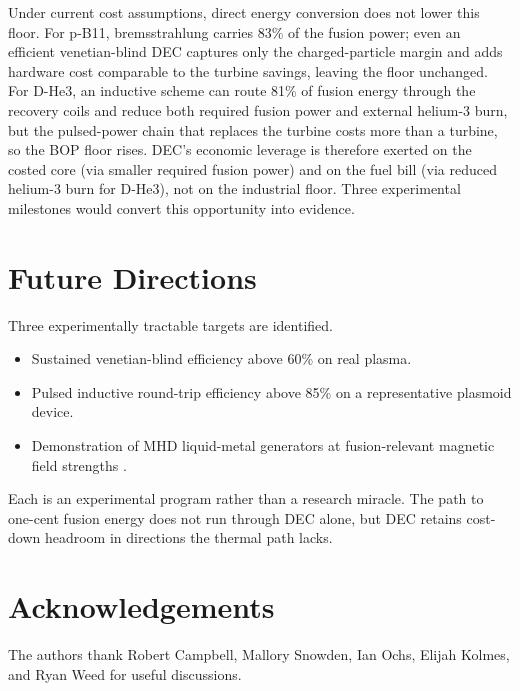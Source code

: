 \documentclass{article}
\begin{document}
Under current cost assumptions, direct energy conversion does not
lower this floor. For p-B11,
bremsstrahlung carries 83\% of the fusion power; even an efficient
venetian-blind DEC captures only the charged-particle margin and
adds hardware cost comparable to the turbine savings, leaving the
floor unchanged. For D-He3, an inductive scheme can route 81\% of
fusion energy through the recovery coils and reduce both required
fusion power and external helium-3 burn, but the pulsed-power chain
that replaces the turbine costs more than a turbine, so the BOP
floor rises. DEC's economic leverage is therefore exerted on the
costed core (via smaller required fusion power) and on the fuel
bill (via reduced helium-3 burn for D-He3), not on the industrial
floor. Three experimental milestones would convert this opportunity
into evidence.

\section{Future Directions}
\label{sec:future}

Three experimentally tractable targets are identified.
\begin{itemize}
\item Sustained venetian-blind efficiency above 60\% on real plasma.
\item Pulsed inductive round-trip efficiency above 85\% on a
representative plasmoid device.
\item Demonstration of MHD liquid-metal generators at
fusion-relevant magnetic field strengths
\citep{Smolentsev2022}.
\end{itemize}
Each is an experimental program rather than a research miracle.
The path to one-cent fusion energy does not run through DEC alone,
but DEC retains cost-down headroom in directions the thermal path
lacks.

\section*{Acknowledgements}
The authors thank Robert Campbell, Mallory Snowden, Ian Ochs, Elijah Kolmes, and
Ryan Weed for useful discussions.



\end{document}
